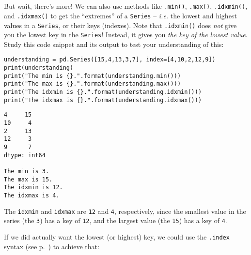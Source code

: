 
\chapter[Associative arrays in Python (3 of 3)]{\huge\selectfont{Associative
arrays in Python (3 of 3)}}
\label{ch:assocArraysInPython3}


But wait, there's more! We can also use methods like \texttt{.min()},
\texttt{.max()}, \texttt{.idxmin()}, and \texttt{.idxmax()} to get the
``extremes'' of a \texttt{Series} -- \textit{i.e.} the lowest and highest
values in a \texttt{Series}, or their keys (indexes). Note that
\texttt{.idxmin()} does \textit{not} give you the lowest key in the
\texttt{Series}! Instead, it gives you \textit{the key of the lowest value}.
Study this code snippet and its output to test your understanding of this:


\begin{Verbatim}[fontsize=\small,samepage=true,frame=single,framesep=3mm]
understanding = pd.Series([15,4,13,3,7], index=[4,10,2,12,9])
print(understanding)
print("The min is {}.".format(understanding.min()))
print("The max is {}.".format(understanding.max()))
print("The idxmin is {}.".format(understanding.idxmin()))
print("The idxmax is {}.".format(understanding.idxmax()))
\end{Verbatim}

\begin{Verbatim}[fontsize=\small,samepage=true,frame=leftline,framesep=5mm,framerule=1mm]
4     15
10     4
2     13
12     3
9      7
dtype: int64

The min is 3.
The max is 15.
The idxmin is 12.
The idxmax is 4.
\end{Verbatim}

The \texttt{idxmin} and \texttt{idxmax} are \texttt{12} and \texttt{4},
respectively, since the smallest value in the series (the \texttt{3}) has a key
of \texttt{12}, and the largest value (the \texttt{15}) has a key of
\texttt{4}.


If we did actually want the lowest (or highest) key, we could use the
\texttt{.index} syntax (see p.~\pageref{dotIndex}) to achieve that:

